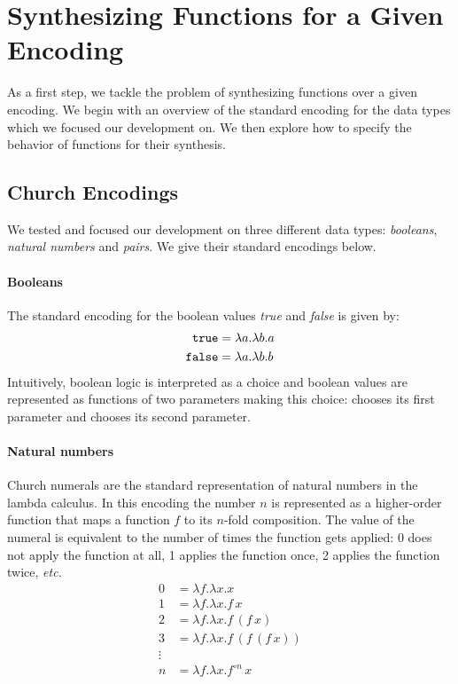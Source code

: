 \section{Synthesizing Functions for a Given Encoding} \label{sec:synthesis}
%
As a first step, we tackle the problem of synthesizing
functions over a given encoding.
%
We begin with an overview of the standard encoding for the
data types which we focused our development on.
%
We then explore how to specify the behavior of functions for
their synthesis.


\subsection{Church Encodings}
%
We tested and focused our development on three
different data types: \emph{booleans}, \emph{natural
numbers} and \emph{pairs}.
%
We give their standard encodings below.

\paragraph{Booleans}
%
The standard encoding for the boolean values \emph{true} and
\emph{false} is given by:
%
\begin{align*}
  \text{\texttt{true}} &= \lambda a . \lambda b . a \\
  \text{\texttt{false}} &= \lambda a . \lambda b . b
\end{align*}
%
Intuitively, boolean logic is interpreted as a choice and
boolean values are represented as functions of two
parameters making this choice: \true chooses its first
parameter and \false chooses its second parameter.

\paragraph{Natural numbers}
%
Church numerals are the standard representation of natural
numbers in the lambda calculus.
%
In this encoding the number $n$ is represented as a
higher-order function that maps a function $f$ to its
$n$-fold composition.
%
The value of the numeral is equivalent to the number of
times the function gets applied: 0 does not apply the
function at all, 1 applies the function once, 2 applies the
function twice, \emph{etc.}
%
\begin{align*}
  0 & = \lambda f . \lambda x . x \\
  1 & = \lambda f . \lambda x . f\,x \\
  2 & = \lambda f . \lambda x . f\,(f\,x) \\
  3 & = \lambda f . \lambda x . f\,(f\,(f\,x)) \\
  \vdots & \\
  n & = \lambda f . \lambda x . f^{\circ n}\,x
\end{align*}

